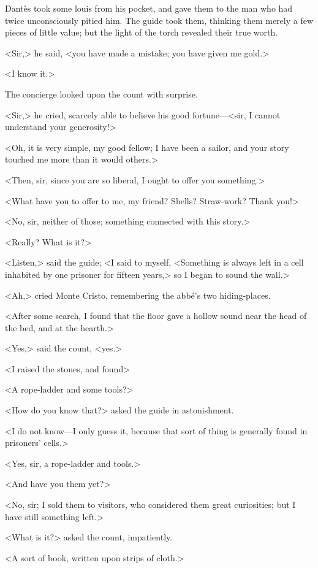  Dantès took some louis from his pocket, and gave them to the man who had twice unconsciously pitied him. The guide took them, thinking them merely a few pieces of little value; but the light of the torch revealed their true worth. 

 <Sir,> he said, <you have made a mistake; you have given me gold.> 

 <I know it.> 

 The concierge looked upon the count with surprise. 

 <Sir,> he cried, scarcely able to believe his good fortune—<sir, I cannot understand your generosity!> 

 <Oh, it is very simple, my good fellow; I have been a sailor, and your story touched me more than it would others.> 

 <Then, sir, since you are so liberal, I ought to offer you something.>

<What have you to offer to me, my friend? Shells? Straw-work? Thank you!> 

 <No, sir, neither of those; something connected with this story.> 

 <Really? What is it?> 

 <Listen,> said the guide; <I said to myself, <Something is always left in a cell inhabited by one prisoner for fifteen years,> so I began to sound the wall.> 

 <Ah,> cried Monte Cristo, remembering the abbé's two hiding-places. 

 <After some search, I found that the floor gave a hollow sound near the head of the bed, and at the hearth.> 

 <Yes,> said the count, <yes.> 

 <I raised the stones, and found\longdash> 

 <A rope-ladder and some tools?> 

 <How do you know that?> asked the guide in astonishment. 

 <I do not know—I only guess it, because that sort of thing is generally found in prisoners' cells.> 

 <Yes, sir, a rope-ladder and tools.> 

 <And have you them yet?> 

 <No, sir; I sold them to visitors, who considered them great curiosities; but I have still something left.> 

 <What is it?> asked the count, impatiently. 

 <A sort of book, written upon strips of cloth.> 

